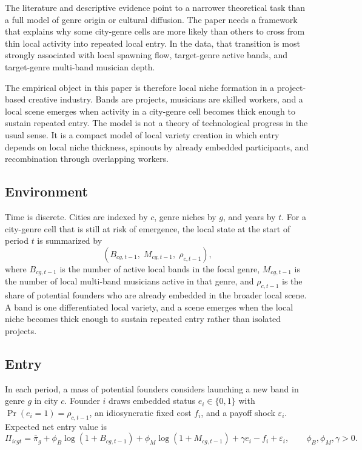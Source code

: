 The literature and descriptive evidence point to a narrower theoretical task than a full model of
genre origin or cultural diffusion. The paper needs a framework that explains why some
city-genre cells are more likely than others to cross from thin local activity into repeated local
entry. In the data, that transition is most strongly associated with local spawning flow,
target-genre active bands, and target-genre multi-band musician depth.

The empirical object in this paper is therefore local niche formation in a project-based creative
industry. Bands are projects, musicians are skilled workers, and a local scene emerges when
activity in a city-genre cell becomes thick enough to sustain repeated entry. The model is not a
theory of technological progress in the usual sense. It is a compact model of local variety
creation in which entry depends on local niche thickness, spinouts by already embedded
participants, and recombination through overlapping workers.

\subsection*{Environment}

Time is discrete. Cities are indexed by $c$, genre niches by $g$, and years by $t$. For a
city-genre cell that is still at risk of emergence, the local state at the start of period $t$ is
summarized by
\[
\left(B_{cg,t-1},\; M_{cg,t-1},\; \rho_{c,t-1}\right),
\]
where $B_{cg,t-1}$ is the number of active local bands in the focal genre, $M_{cg,t-1}$ is the
number of local multi-band musicians active in that genre, and $\rho_{c,t-1}$ is the share of
potential founders who are already embedded in the broader local scene. A band is one
differentiated local variety, and a scene emerges when the local niche becomes thick enough to
sustain repeated entry rather than isolated projects.

\subsection*{Entry}

In each period, a mass of potential founders considers launching a new band in genre $g$ in city
$c$. Founder $i$ draws embedded status $e_i \in \{0,1\}$ with
$\Pr(e_i = 1) = \rho_{c,t-1}$, an idiosyncratic fixed cost $f_i$, and a payoff shock
$\varepsilon_i$. Expected net entry value is
\begin{equation}
\Pi_{icgt}
=
\bar{\pi}_g
+ \phi_B \log(1 + B_{cg,t-1})
+ \phi_M \log(1 + M_{cg,t-1})
+ \gamma e_i
- f_i
+ \varepsilon_i,
\qquad
\phi_B,\phi_M,\gamma > 0.
\end{equation}

